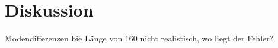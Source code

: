 \section{Diskussion}
\label{sec:Diskussion}


Modendifferenzen bie Länge von 160 nicht realistisch, wo liegt der Fehler?

